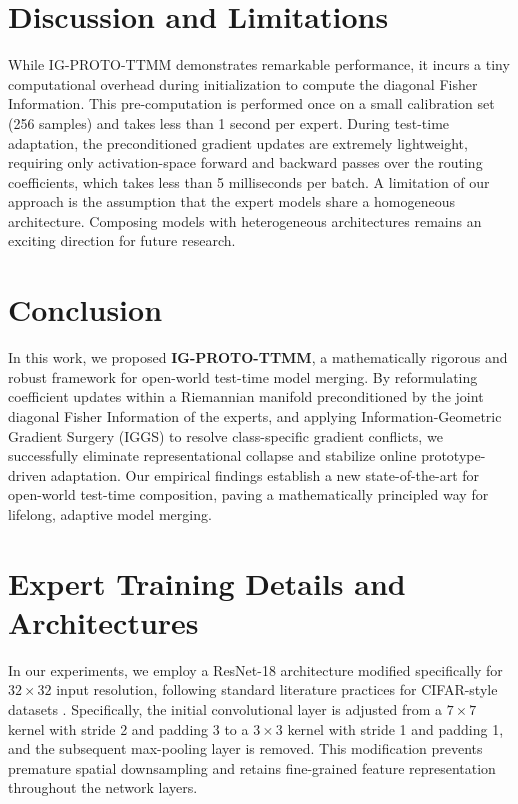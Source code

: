 \documentclass{article}
\theoremstyle{plain}
\theoremstyle{definition}
\theoremstyle{remark}
\begin{document}
\section{Discussion and Limitations}
\label{discussion}
While IG-PROTO-TTMM demonstrates remarkable performance, it incurs a tiny computational overhead during initialization to compute the diagonal Fisher Information. This pre-computation is performed once on a small calibration set (256 samples) and takes less than 1 second per expert. During test-time adaptation, the preconditioned gradient updates are extremely lightweight, requiring only activation-space forward and backward passes over the routing coefficients, which takes less than 5 milliseconds per batch.
A limitation of our approach is the assumption that the expert models share a homogeneous architecture. Composing models with heterogeneous architectures remains an exciting direction for future research.

\section{Conclusion}
\label{conclusion}
In this work, we proposed \textbf{IG-PROTO-TTMM}, a mathematically rigorous and robust framework for open-world test-time model merging. By reformulating coefficient updates within a Riemannian manifold preconditioned by the joint diagonal Fisher Information of the experts, and applying Information-Geometric Gradient Surgery (IGGS) to resolve class-specific gradient conflicts, we successfully eliminate representational collapse and stabilize online prototype-driven adaptation. Our empirical findings establish a new state-of-the-art for open-world test-time composition, paving a mathematically principled way for lifelong, adaptive model merging.

\nocite{*}



\clearpage
\appendix
\onecolumn
\section{Expert Training Details and Architectures}
\label{app:experts}

In our experiments, we employ a ResNet-18 architecture modified specifically for $32 \times 32$ input resolution, following standard literature practices for CIFAR-style datasets \citep{he2016deep}. Specifically, the initial convolutional layer is adjusted from a $7 \times 7$ kernel with stride 2 and padding 3 to a $3 \times 3$ kernel with stride 1 and padding 1, and the subsequent max-pooling layer is removed. This modification prevents premature spatial downsampling and retains fine-grained feature representation throughout the network layers.
\end{document}
